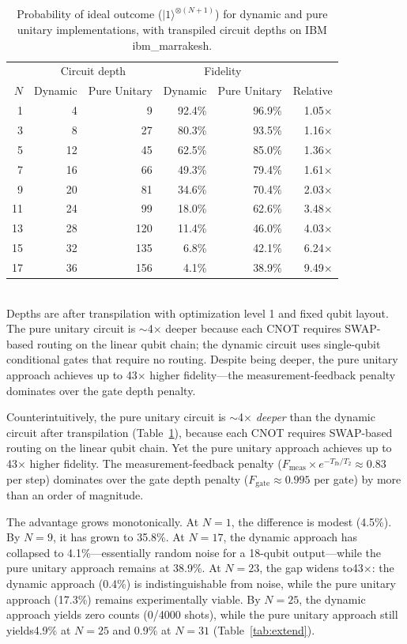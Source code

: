 \documentclass[11pt]{article}
\begin{document}
\begin{table}[h]
\centering
\caption{Probability of ideal outcome ($|1\rangle^{\otimes(N+1)}$) for dynamic and pure unitary implementations, with transpiled circuit depths on IBM ibm\_marrakesh.}
\label{tab:results}
\begin{tabular}{@{}rrrrrr@{}}
\toprule
 & \multicolumn{2}{c}{Circuit depth} & \multicolumn{2}{c}{Fidelity} & \\
$N$ & Dynamic & Pure Unitary & Dynamic & Pure Unitary & Relative \\
\midrule
1  &   4 &   9 & 92.4\% & 96.9\% & 1.05$\times$ \\
3  &   8 &  27 & 80.3\% & 93.5\% & 1.16$\times$ \\
5  &  12 &  45 & 62.5\% & 85.0\% & 1.36$\times$ \\
7  &  16 &  66 & 49.3\% & 79.4\% & 1.61$\times$ \\
9  &  20 &  81 & 34.6\% & 70.4\% & 2.03$\times$ \\
11 &  24 &  99 & 18.0\% & 62.6\% & 3.48$\times$ \\
13 &  28 & 120 & 11.4\% & 46.0\% & 4.03$\times$ \\
15 &  32 & 135 &  6.8\% & 42.1\% & 6.24$\times$ \\
17 &  36 & 156 &  4.1\% & 38.9\% & 9.49$\times$ \\
\bottomrule
\end{tabular}
\\[3pt]
\footnotesize{Depths are after transpilation with optimization level 1 and fixed qubit layout. The pure unitary circuit is $\sim$4$\times$ deeper because each CNOT requires SWAP-based routing on the linear qubit chain; the dynamic circuit uses single-qubit conditional gates that require no routing. Despite being deeper, the pure unitary approach achieves up to 43$\times$ higher fidelity---the measurement-feedback penalty dominates over the gate depth penalty.}
\end{table}
Counterintuitively, the pure unitary circuit is $\sim$4$\times$ \emph{deeper} than the dynamic circuit after transpilation (Table~\ref{tab:results}), because each CNOT requires SWAP-based routing on the linear qubit chain.
Yet the pure unitary approach achieves up to 43$\times$ higher fidelity.
The measurement-feedback penalty ($F_\text{meas} \times e^{-T_\text{fb}/T_2} \approx 0.83$ per step) dominates over the gate depth penalty ($F_\text{gate} \approx 0.995$ per gate) by more than an order of magnitude.

The advantage grows monotonically.
At $N=1$, the difference is modest (4.5\%).
By $N=9$, it has grown to 35.8\%.
At $N=17$, the dynamic approach has collapsed to 4.1\%---essentially random noise for a 18-qubit output---while the pure unitary approach remains at 38.9\%.
At $N=23$, the gap widens to43$\times$: the dynamic approach (0.4\%) is indistinguishable from noise, while the pure unitary approach (17.3\%) remains experimentally viable.
By $N=25$, the dynamic approach yields zero counts (0/4000 shots), while the pure unitary approach still yields4.9\% at $N=25$ and 0.9\% at $N=31$ (Table~\ref{tab:extend}).
\end{document}
